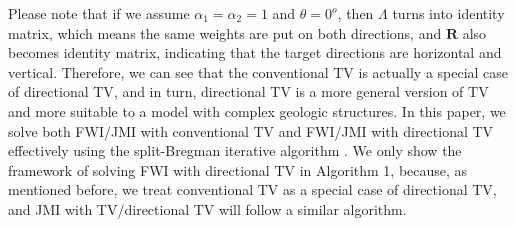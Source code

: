 Please note that if we assume $\alpha_1 = \alpha_2 = 1$ and $\theta = 0^o$, then $\Lambda$ turns into  identity matrix, which means the same weights are put on both directions, and $\mathbf{R}$ also becomes  identity matrix, indicating that the target directions are horizontal and vertical. Therefore, we can see that the conventional TV is actually a special case of  directional TV, and in turn,  directional TV is a more general version of  TV and more suitable to a model with complex geologic structures. In this paper, we solve both FWI/JMI with  conventional TV and FWI/JMI with  directional TV effectively using the split-Bregman iterative algorithm \citep{goldstein2009split}. We only show the framework of solving FWI with  directional TV in Algorithm 1, because, as mentioned before, we treat  conventional TV as a special case of directional  TV, and JMI with  TV/directional TV will follow a similar algorithm.

%  

